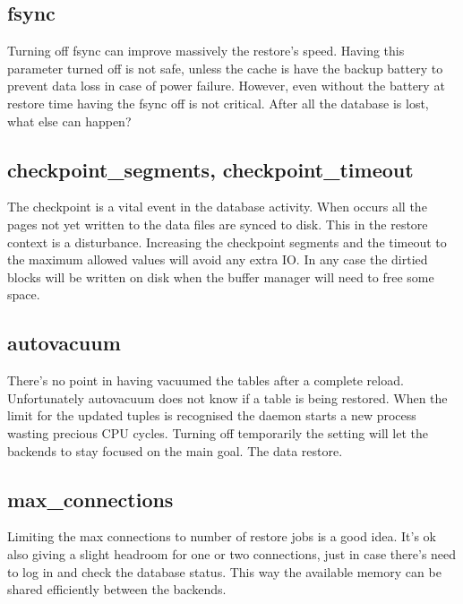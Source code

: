 \subsection{fsync}
Turning off fsync can improve massively the restore's speed. Having this parameter turned off
is not safe, unless the cache is have the backup battery to prevent data loss in case of power
failure. However, even without the battery at restore time having the fsync off is not critical.
After all the database is lost, what else can happen?

\subsection{checkpoint\_segments, checkpoint\_timeout}
The checkpoint is a vital event in the database activity. When occurs all the pages not yet written
to the data files are synced to disk. This in the restore context is a disturbance. Increasing the
checkpoint segments and the timeout to the maximum allowed values will avoid any extra IO. In any
case the dirtied blocks will be written on disk when the buffer manager will need to free some
space.


\subsection{autovacuum}
There's no point in having vacuumed the tables after a complete reload. Unfortunately autovacuum
does not know if a table is being restored. When the limit for the updated tuples is recognised the
daemon starts a new process wasting precious CPU cycles. Turning off temporarily the setting will
let the backends to stay focused on the main goal. The data restore.


\subsection{max\_connections}
Limiting the max connections to number of restore jobs is a good idea. It's ok also giving a slight
headroom for one or two connections, just in case there's need to log in and check the database
status. This way the available memory can be shared efficiently between the backends.

